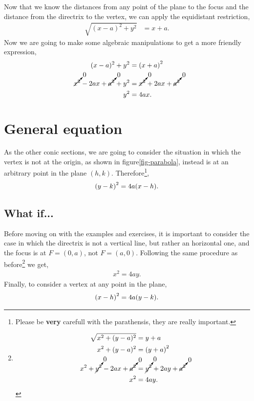 \documentclass[../main-notes.tex]{subfiles}
\begin{document}
Now that we know the distances from any point of the plane to the focus and the distance from the directrix to the vertex, we can apply the equidistant restriction,
\begin{align*}
    \sqrt{(x-a)^2 + y^2} &= x+a.
\end{align*}
Now we are going to make some algebraic manipulations to get a more friendly expression,
\begin{align*}
    (x-a)^2 + y^2 &= \qty(x+a)^2 \\
    \cancelto{0}{x^2} -2ax +\cancelto{0}{a^2} + y^2 &= \cancelto{0}{x^2} +2ax +\cancelto{0}{a^2} \\
    y^2 &= 4ax. 
\end{align*}

\section{General equation}

As the other conic sections, we are going to consider the situation in which the vertex is not at the origin, as shown in figure\ref{fig-parabola}, instead is at an arbitrary point in the plane $(h,k)$.
Therefore\footnote{Please be \textbf{very} carefull with the parathensis, they are really important.},
\begin{gather*}
    \qty(y-k)^2 = 4a\qty(x-h).
\end{gather*}

\subsection{What if...}

Before moving on with the examples and exercises, it is important to consider the case in which the directrix is not a vertical line, but rather an horizontal one, and the focus is at $F=(0,a)$, not $F=(a,0)$.
Following the same procedure as before\footnote{
\begin{align*}
    \sqrt{x^2 + (y-a)^2} &= y+a \\
    x^2 + (y-a)^2 &= \qty(y+a)^2 \\
    x^2 + \cancelto{0}{y^2} -2ax +\cancelto{0}{a^2} &= \cancelto{0}{y^2} +2ay +\cancelto{0}{a^2} \\
    x^2 &= 4ay. 
\end{align*}
}
we get,
\begin{gather*}
    x^2 = 4ay.
\end{gather*}
Finally, to consider a vertex at any point in the plane,
\begin{gather*}
    \qty(x-h)^2 = 4a\qty(y-k).
\end{gather*}
\end{document}

